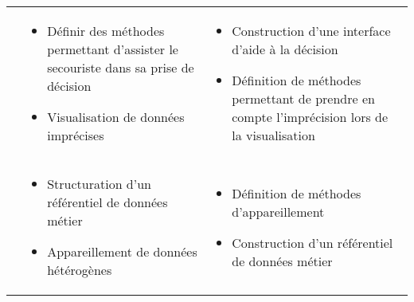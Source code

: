 \begin{tabular}{p{.15\textheight}>{\small}L{.35\textheight}>{\small}L{.4\textheight}}
  \addlinespace[.5cm]
& \begin{minipage}[t]{.35\textheight}
    \begin{itemize}
    \item Définir des méthodes permettant d'assister le secouriste
      dans sa prise de décision
    \item Visualisation de données imprécises
    \end{itemize}
  \end{minipage}& \begin{minipage}[t]{.4\textheight}
    \begin{itemize}
    \item Construction d'une interface d'aide à la décision
    \item Définition de méthodes permettant de prendre en compte
      l'imprécision lors de la visualisation
    \end{itemize}
  \end{minipage} \\
  \addlinespace[.5cm]
& \begin{minipage}[t]{.35\textheight}
    \begin{itemize}
    \item Structuration d'un référentiel de données métier
    \item Appareillement de données hétérogènes
    \end{itemize}
  \end{minipage}& \begin{minipage}[t]{.4\textheight}
    \begin{itemize}
    \item Définition de méthodes d'appareillement
    \item Construction d'un référentiel de données métier
    \end{itemize}
  \end{minipage}\\
  \bottomrule
\end{tabular}
